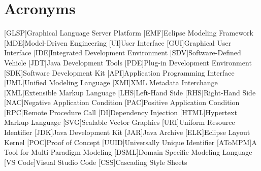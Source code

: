 \newpage
\section{Acronyms}
\label{sec:acronyms}
\begin{acronym}[AToMPM]
    [GLSP]{Graphical Language Server Platform}
    [EMF]{Eclipse Modeling Framework}
    [MDE]{Model-Driven Engineering}
    [UI]{User Interface}
    [GUI]{Graphical User Interface}
    [IDE]{Integrated Development Environment}
    [SDV]{Software-Defined Vehicle}
    [JDT]{Java Development Tools}
    [PDE]{Plug-in Development Environment}
    [SDK]{Software Development Kit}
    [API]{Application Programming Interface}
    [UML]{Unified Modeling Language}
    [XMI]{XML Metadata Interchange}
    [XML]{Extensible Markup Language}
    [LHS]{Left-Hand Side}
    [RHS]{Right-Hand Side}
    [NAC]{Negative Application Condition}
    [PAC]{Positive Application Condition}
    [RPC]{Remote Procedure Call}
    [DI]{Dependency Injection}
    [HTML]{Hypertext Markup Language}
    [SVG]{Scalable Vector Graphics}
    [URI]{Uniform Resource Identifier}
    [JDK]{Java Development Kit}
    [JAR]{Java Archive}
    [ELK]{Eclipse Layout Kernel}
    [POC]{Proof of Concept}
    [UUID]{Universally Unique Identifier}
    [AToMPM]{A Tool for Multi-Paradigm Modeling}
    [DSML]{Domain Specific Modeling Language}
    [VS Code]{Visual Studio Code}
    [CSS]{Cascading Style Sheets}
  \end{acronym}